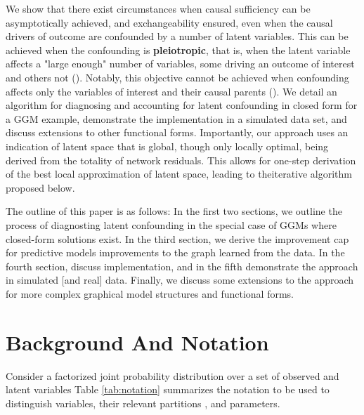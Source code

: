 \documentclass{article}
\begin{document}
We show that there exist circumstances when causal sufficiency can be asymptotically achieved, and exchangeability ensured, even when the causal drivers of outcome are confounded by a number of latent variables.  This can be achieved when the confounding is \textbf{pleiotropic}, that is,  when the latent variable affects a "large enough" number of variables, some driving an outcome of interest and others not (\cite{anandkumar_learning_2013}).  Notably, this objective cannot be achieved when confounding affects only the variables of interest and their causal parents (\cite{damour_multi-cause_2019}). We detail an algorithm for diagnosing and accounting for latent confounding in closed form for a GGM example, demonstrate the implementation in a simulated data set, and discuss extensions to other functional forms.  Importantly, our approach uses an indication of latent space that is global, though only locally optimal, being derived from the totality of network residuals. This allows for one-step derivation of the best local approximation of latent space, leading to theiterative algorithm proposed below.

The outline of this paper is as follows: In the first two sections, we outline the process of diagnosting latent confounding in the special case of GGMs where closed-form solutions exist. In the third section, we derive the improvement cap for predictive models improvements to the graph learned from the data. In the fourth section, discuss implementation, and in the fifth demonstrate the approach in simulated [and real] data. Finally, we discuss some extensions to the approach for more complex graphical model structures and functional forms. 

\section{Background And Notation}
\label{Background}

Consider a factorized joint probability distribution over a set of observed and latent variables Table \ref{tab:notation} summarizes the notation to be used to distinguish variables, their relevant partitions , and parameters. 
\end{document}
